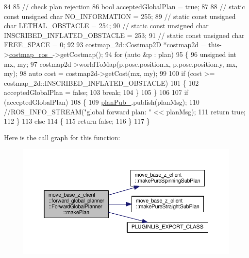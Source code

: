 \begin{DoxyCode}
84 
85     \textcolor{comment}{// check plan rejection}
86     \textcolor{keywordtype}{bool} acceptedGlobalPlan = \textcolor{keyword}{true};
87 
88     \textcolor{comment}{// static const unsigned char NO\_INFORMATION = 255;}
89     \textcolor{comment}{// static const unsigned char LETHAL\_OBSTACLE = 254;}
90     \textcolor{comment}{// static const unsigned char INSCRIBED\_INFLATED\_OBSTACLE = 253;}
91     \textcolor{comment}{// static const unsigned char FREE\_SPACE = 0;}
92 
93     costmap\_2d::Costmap2D *costmap2d = this->\hyperlink{classmove__base__z__client_1_1forward__global__planner_1_1ForwardGlobalPlanner_aba11d85f5f4c9370873195ca97497a22}{costmap\_ros\_}->getCostmap();
94     \textcolor{keywordflow}{for} (\textcolor{keyword}{auto} &p : plan)
95     \{
96         \textcolor{keywordtype}{unsigned} \textcolor{keywordtype}{int} mx, my;
97         costmap2d->worldToMap(p.pose.position.x, p.pose.position.y, mx, my);
98         \textcolor{keyword}{auto} cost = costmap2d->getCost(mx, my);
99 
100         \textcolor{keywordflow}{if} (cost >= costmap\_2d::INSCRIBED\_INFLATED\_OBSTACLE)
101         \{
102             acceptedGlobalPlan = \textcolor{keyword}{false};
103             \textcolor{keywordflow}{break};
104         \}
105     \}
106 
107     \textcolor{keywordflow}{if} (acceptedGlobalPlan)
108     \{
109         \hyperlink{classmove__base__z__client_1_1forward__global__planner_1_1ForwardGlobalPlanner_a324f5df4d47440e1ebddb83ee53d5908}{planPub\_}.publish(planMsg);
110         \textcolor{comment}{//ROS\_INFO\_STREAM("global forward plan: " << planMsg);}
111         \textcolor{keywordflow}{return} \textcolor{keyword}{true};
112     \}
113     \textcolor{keywordflow}{else}
114     \{
115         \textcolor{keywordflow}{return} \textcolor{keyword}{false};
116     \}
117 \}
\end{DoxyCode}


Here is the call graph for this function\+:\nopagebreak
\begin{figure}[H]
\begin{center}
\leavevmode
\includegraphics[width=350pt]{classmove__base__z__client_1_1forward__global__planner_1_1ForwardGlobalPlanner_a2dcf9aad74efaaa92ee78650f7a23096_cgraph}
\end{center}
\end{figure}




